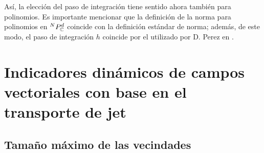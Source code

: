 Así, la elección del paso de integración tiene sentido ahora también para polinomios. Es importante mencionar que la definición de la norma para polinomios en ${^{N}P_{\mathbb{C}}^ d }$ coincide con la definición estándar de norma; además, de este modo, el paso de integración $h$ coincide por el utilizado por D. Perez en \cite{P-palau}.

\section{Indicadores dinámicos de campos vectoriales con base en el transporte de jet}
\label{sec:ind-dinam}


\subsection{Tamaño máximo de las vecindades}